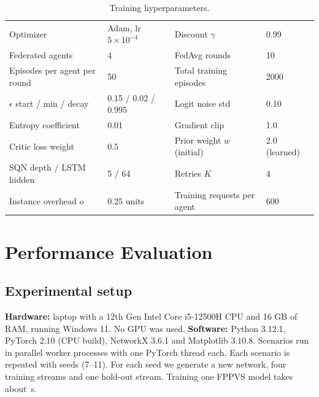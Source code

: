 \documentclass[11pt,a4paper]{article}
\begin{document}
\begin{table}[H]
\centering\small
\caption{Training hyperparameters.}
\label{tab:hyper}
\begin{tabular}{ll@{\qquad}ll}
\toprule
Optimizer & Adam, lr $5\times10^{-4}$ & Discount $\gamma$ & 0.99 \\
Federated agents & 4 & FedAvg rounds & 10 \\
Episodes per agent per round & 50 & Total training episodes & 2000 \\
$\epsilon$ start / min / decay & 0.15 / 0.02 / 0.995 & Logit noise std & 0.10 \\
Entropy coefficient & 0.01 & Gradient clip & 1.0 \\
Critic loss weight & 0.5 & Prior weight $w$ (initial) & 2.0 (learned) \\
SQN depth / LSTM hidden & 5 / 64 & Retries $K$ & 4 \\
Instance overhead $o$ & 0.25 units & Training requests per agent & 600 \\
\bottomrule
\end{tabular}
\end{table}

\section{Performance Evaluation}

\subsection{Experimental setup}
\textbf{Hardware:} laptop with a 12th Gen Intel Core i5-12500H CPU and 16 GB of
RAM, running Windows 11. No GPU was used. \textbf{Software:} Python 3.12.1,
PyTorch 2.10 (CPU build), NetworkX 3.6.1 and Matplotlib 3.10.8. Scenarios run in
parallel worker processes with one PyTorch thread each. Each scenario is
repeated with \numSeeds{} seeds (7--11). For each seed we generate a new network,
four training streams and one hold-out stream. Training one FPPVS model takes
about \trainSeconds\,s.
\end{document}
